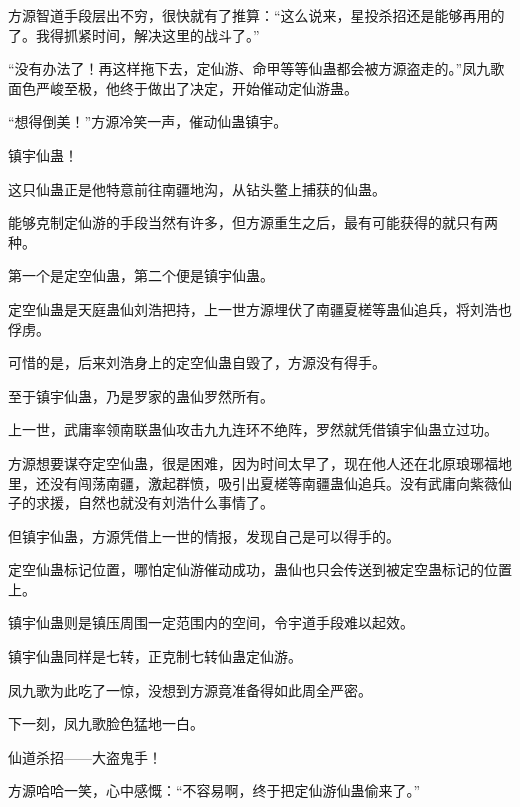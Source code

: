 \begin{this_body}
方源智道手段层出不穷，很快就有了推算：“这么说来，星投杀招还是能够再用的了。我得抓紧时间，解决这里的战斗了。”

“没有办法了！再这样拖下去，定仙游、命甲等等仙蛊都会被方源盗走的。”凤九歌面色严峻至极，他终于做出了决定，开始催动定仙游蛊。

“想得倒美！”方源冷笑一声，催动仙蛊镇宇。

镇宇仙蛊！

这只仙蛊正是他特意前往南疆地沟，从钻头鳖上捕获的仙蛊。

能够克制定仙游的手段当然有许多，但方源重生之后，最有可能获得的就只有两种。

第一个是定空仙蛊，第二个便是镇宇仙蛊。

定空仙蛊是天庭蛊仙刘浩把持，上一世方源埋伏了南疆夏槎等蛊仙追兵，将刘浩也俘虏。

可惜的是，后来刘浩身上的定空仙蛊自毁了，方源没有得手。

至于镇宇仙蛊，乃是罗家的蛊仙罗然所有。

上一世，武庸率领南联蛊仙攻击九九连环不绝阵，罗然就凭借镇宇仙蛊立过功。

方源想要谋夺定空仙蛊，很是困难，因为时间太早了，现在他人还在北原琅琊福地里，还没有闯荡南疆，激起群愤，吸引出夏槎等南疆蛊仙追兵。没有武庸向紫薇仙子的求援，自然也就没有刘浩什么事情了。

但镇宇仙蛊，方源凭借上一世的情报，发现自己是可以得手的。

定空仙蛊标记位置，哪怕定仙游催动成功，蛊仙也只会传送到被定空蛊标记的位置上。

镇宇仙蛊则是镇压周围一定范围内的空间，令宇道手段难以起效。

镇宇仙蛊同样是七转，正克制七转仙蛊定仙游。

凤九歌为此吃了一惊，没想到方源竟准备得如此周全严密。

下一刻，凤九歌脸色猛地一白。

仙道杀招——大盗鬼手！

方源哈哈一笑，心中感慨：“不容易啊，终于把定仙游仙蛊偷来了。”

\end{this_body}

